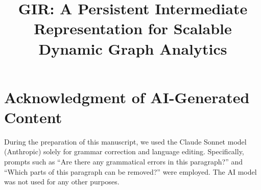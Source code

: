 \documentclass[sigplan,10pt,screen,review,anonymous]{acmart}
\newcommand{\name}{\textsc{GIR}}
\begin{document}
\title{\name: A Persistent Intermediate Representation for Scalable Dynamic Graph Analytics}

\begin{abstract}

\end{abstract}

\maketitle







% 







\balance




\section*{Acknowledgment of AI-Generated Content}
During the preparation of this manuscript, we used the Claude Sonnet model (Anthropic) solely for grammar correction and language editing. Specifically, prompts such as ``Are there any grammatical errors in this paragraph?'' and ``Which parts of this paragraph can be removed?'' were employed. The AI model was not used for any other purposes.
\end{document}
